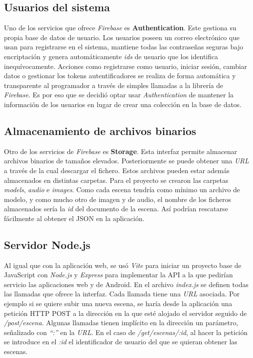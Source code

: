\subsection{Usuarios del sistema}

Uno de los servicios que ofrece \textit{Firebase} es \textbf{Authentication}. Este gestiona su propia base de datos de usuario. Los usuarios poseen un correo electrónico que usan para registrarse en el sistema, mantiene todas las contraseñas seguras bajo encriptación y genera automáticamente \textit{ids} de usuario que los identifica inequívocamente. Acciones como registrarse como usuario, iniciar sesión, cambiar datos o gestionar los tokens autentificadores se realiza de forma automática y transparente al programador a través de simples llamadas a la librería de \textit{Firebase}. Es por eso que se decidió optar usar \textit{Authentication} de mantener la información de los usuarios en lugar de crear una colección en la base de datos.

\subsection{Almacenamiento de archivos binarios}

Otro de los servicios de \textit{Firebase} es \textbf{Storage}. Esta interfaz permite almacenar archivos binarios de tamaños elevados. Posteriormente se puede obtener una \textit{URL} a través de la cual descargar el fichero. Estos archivos pueden estar además almacenados en distintas carpetas. Para el proyecto se crearon las carpetas \textit{models}, \textit{audio} e \textit{images}. Como cada escena tendría como mínimo un archivo de modelo, y como mucho otro de imagen y de audio, el nombre de los ficheros almacenados sería la \textit{id} del documento de la escena. Así podrían rescatarse fácilmente al obtener el JSON en la aplicación.

\subsection{Servidor Node.js}

Al igual que con la aplicación web, se usó \textit{Vite} para iniciar un proyecto base de JavaScript con \textit{Node.js}\cite{nodejs} y \textit{Express}\cite{express} para implementar la API a la que pedirían servicio las aplicaciones web y de Android. En el archivo \textit{index.js} se definen todas las llamadas que ofrece la interfaz. Cada llamada tiene una \textit{URL} asociada. Por ejemplo si se quiere subir una nueva escena, se haría desde la aplicación una petición HTTP POST a la dirección en la que esté alojado el servidor seguido de \textit{/post/escena}. Algunas llamadas tienen implícito en la dirección un parámetro, señalizado con \textit{``:''} en la \textit{URL}. En el caso de \textit{/get/escenas/:id}, al hacer la petición se introduce en el \textit{:id} el identificador de usuario del que se quieran obtener las escenas.

